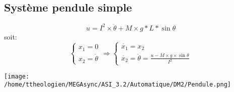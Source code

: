 \documentclass[a4paper,12pt]{article}
\begin{document}
    \subsection{Système pendule simple}
    \label{sub:Système pendule simple}
      \[u = I^2 \times \ddot{\theta} + M \times g * L * \sin{\theta}\]
      soit:
      \[
        \left\{
          \begin{array}{ll}
            x_1 = 0\\
            x_2 = \dot{\theta}
          \end{array}
        \right.
        \Rightarrow
        \left\{
          \begin{array}{ll}
            \dot{x_1} = x_2\\
            \dot{x_2} = \ddot{\theta} = \frac{u - M \times g \times \sin{\theta}}{I^2}
          \end{array}
        \right.
      \]

      \begin{center}
        \texttt{[image: /home/ttheologien/MEGAsync/ASI\_3.2/Automatique/DM2/Pendule.png]}
      \end{center}

      \newpage
\end{document}
